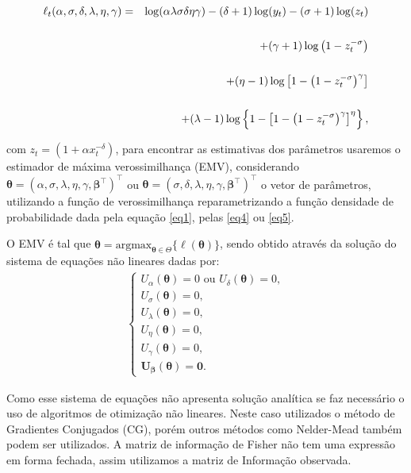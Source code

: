 \documentclass{sciposter}
\begin{document}
\begin{multicols}{3}
{\begin{eqnarray*}
\ell_t(\alpha,\sigma,\delta,\lambda,\eta,\gamma)&=&\log(\alpha\lambda\sigma\delta\eta\gamma)-(\delta+1)\log(y_t)-(\sigma+1)\log(z_t)\nonumber\\
\\
\vspace{-0.3cm}&&+(\gamma+1)\log\left(1-z_t^{-\sigma}\right)\nonumber\\
\\
\vspace{-0.3cm}&&+(\eta-1)\log\left[1-\left(1-z_t^{-\sigma}\right)^\gamma\right]\nonumber\\
\\
\vspace{-0.3cm}&&+(\lambda-1)\log\left\{1-\left[1-\left(1-z_t^{-\sigma}\right)^{\gamma}\right]^{\eta}\right\},\nonumber
\end{eqnarray*}

\noindent com $z_t=(1+\alpha x_t^{-\delta})$, para encontrar as estimativas dos parâmetros usaremos o estimador de máxima verossimilhança (EMV), considerando $\bm{\theta}=(\alpha,\sigma,\lambda,\eta,\gamma,\bm{\beta}^{\top})^{\top}$ ou $\bm{\theta}=(\sigma,\delta,\lambda,\eta,\gamma,\bm{\beta}^{\top})^{\top}$ o vetor de parâmetros, utilizando a função de verossimilhança reparametrizando a função densidade de probabilidade dada pela equação \eqref{eq1}, pelas \eqref{eq4} ou \eqref{eq5}.

O EMV é tal que $\widehat{\boldsymbol{\theta}}=\mbox{argmax}_{{\boldsymbol{\theta}}\in \Theta}\{\ell(\boldsymbol{\theta})\}$, sendo obtido através da solução do sistema de equações não lineares dadas por:
\begin{align}\label{eq8}
\left\{ \begin{array}{l}
U_{\alpha}(\bm\theta) = 0\mbox{ ou }U_{\delta}(\bm\theta) = 0,\\
U_{\sigma}(\bm\theta) = 0,\\
U_{\lambda}(\bm\theta) = 0, \\
U_{\eta}(\bm\theta) = 0, \\
U_{\gamma}(\bm\theta) = 0, \\
\bm{U}_{\bm{\beta}}({\bm\theta}) = \bm{0}.
\end{array} \right.
\end{align}

Como esse sistema de equações não apresenta solução analítica se faz necessário o uso de algoritmos de otimização não lineares. Neste caso utilizados o método de Gradientes Conjugados (CG), porém outros métodos como Nelder-Mead também podem ser utilizados. A matriz de informação de Fisher não tem uma expressão em forma fechada, assim utilizamos a matriz de Informação observada.


}
\end{multicols}
\end{document}
